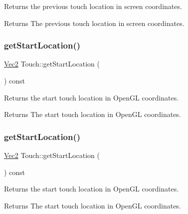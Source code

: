 Returns the previous touch location in screen coordinates.

\begin{DoxyReturn}{Returns}
The previous touch location in screen coordinates. 
\end{DoxyReturn}
\mbox{\label{classTouch_a41f954b7af4bd5ae3af1f78ace3bc4e2}} 
\subsubsection{\texorpdfstring{get\+Start\+Location()}{getStartLocation()}\hspace{0.1cm}{\footnotesize\ttfamily [1/2]}}
{\footnotesize\ttfamily \hyperlink{classVec2}{Vec2} Touch\+::get\+Start\+Location (\begin{DoxyParamCaption}{ }\end{DoxyParamCaption}) const}

Returns the start touch location in Open\+GL coordinates.

\begin{DoxyReturn}{Returns}
The start touch location in Open\+GL coordinates. 
\end{DoxyReturn}
\mbox{\label{classTouch_a41f954b7af4bd5ae3af1f78ace3bc4e2}} 
\subsubsection{\texorpdfstring{get\+Start\+Location()}{getStartLocation()}\hspace{0.1cm}{\footnotesize\ttfamily [2/2]}}
{\footnotesize\ttfamily \hyperlink{classVec2}{Vec2} Touch\+::get\+Start\+Location (\begin{DoxyParamCaption}{ }\end{DoxyParamCaption}) const}

Returns the start touch location in Open\+GL coordinates.

\begin{DoxyReturn}{Returns}
The start touch location in Open\+GL coordinates. 
\end{DoxyReturn}
\mbox{\label{classTouch_a9e7c3b29da7fc935b3e894a48f1fc716}} 
